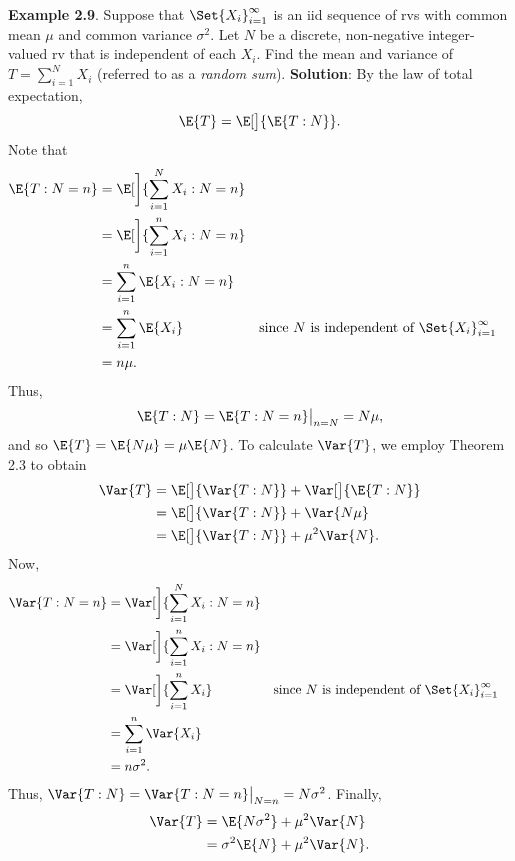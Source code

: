 \begin{Example}{}
    \textbf{Example 2.9}. Suppose that $ \Set{X_i}_{i=1}^\infty $ is an iid sequence of rvs with common mean $ \mu $
    and common variance $ \sigma^2 $. Let $ N $ be a discrete, non-negative integer-valued rv that
    is independent of each $ X_i $. Find the mean and variance of $ T=\sum_{i=1}^{N} X_i $
    (referred to as a \emph{random sum}).
    \tcblower{}
    \textbf{Solution}: By the law of total expectation,
    \[ \E{T}=\E[\big]{\E{T\given N}}. \]
    Note that
    \begin{align*}
        \E{T\given N=n}
         & =\E[\bigg]{\sum_{i=1}^{N} X_i\given N=n}                                                                      \\
         & =\E[\bigg]{\sum_{i=1}^{n} X_i\given N=n}                                                                      \\
         & =\sum_{i=1}^{n} \E{X_i\given N=n}                                                                             \\
         & =\sum_{i=1}^{n} \E{X_i}                  &  & \text{since $ N $ is independent of $ \Set{X_i}_{i=1}^\infty $} \\
         & =n \mu.
    \end{align*}
    Thus,
    \[ \E{T\given N}=\E{T\given N=n}\big\rvert_{n=N}=N\mu, \]
    and so $ \E{T}=\E{N\mu}=\mu\E{N} $. To calculate $ \Var{T} $, we employ Theorem 2.3 to obtain
    \begin{align*}
        \Var{T}
         & =\E[\big]{\Var{T\given N}}+\Var[\big]{\E{T\given N}} \\
         & =\E[\big]{\Var{T\given N}}+\Var{N\mu}                \\
         & =\E[\big]{\Var{T\given N}}+\mu^2\Var{N}.
    \end{align*}
    Now,
    \begin{align*}
        \Var{T\given N=n}
         & =\Var[\bigg]{\sum_{i=1}^{N} X_i\given N=n}                                                                      \\
         & =\Var[\bigg]{\sum_{i=1}^{n}X_i\given N=n }                                                                      \\
         & =\Var[\bigg]{\sum_{i=1}^{n} X_i}           &  & \text{since $ N $ is independent of $ \Set{X_i}_{i=1}^\infty $} \\
         & =\sum_{i=1}^{n} \Var{X_i}                                                                                       \\
         & =n\sigma^2.
    \end{align*}
    Thus, $ \Var{T\given N}=\Var{T\given N=n}\big\rvert_{N=n}=N\sigma^2 $. Finally,
    \begin{align*}
        \Var{T} & =\E{N\sigma^2}+\mu^2\Var{N}  \\
                & =\sigma^2\E{N}+\mu^2\Var{N}.
    \end{align*}
\end{Example}
